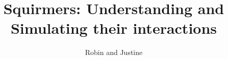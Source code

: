 \documentclass[options]{article}
\begin{document}
\title{Squirmers: Understanding and Simulating their interactions}
\author{Robin and Justine}
\maketitle

\nocite{*}


\end{document}
